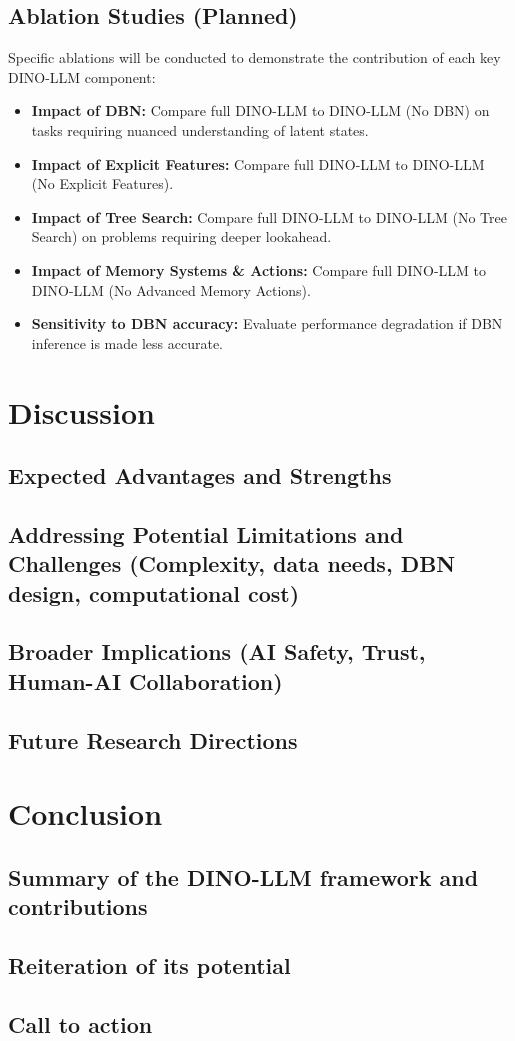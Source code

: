 \documentclass[11pt]{article}
\begin{document}
\subsection{Ablation Studies (Planned)}
\label{ssec:case_study_ablations}
Specific ablations will be conducted to demonstrate the contribution of each key DINO-LLM component:
\begin{itemize}
    \item \textbf{Impact of DBN:} Compare full DINO-LLM to DINO-LLM (No DBN) on tasks requiring nuanced understanding of latent states.
    \item \textbf{Impact of Explicit Features:} Compare full DINO-LLM to DINO-LLM (No Explicit Features).
    \item \textbf{Impact of Tree Search:} Compare full DINO-LLM to DINO-LLM (No Tree Search) on problems requiring deeper lookahead.
    \item \textbf{Impact of Memory Systems & Actions:} Compare full DINO-LLM to DINO-LLM (No Advanced Memory Actions).
    \item \textbf{Sensitivity to DBN accuracy:} Evaluate performance degradation if DBN inference is made less accurate.
\end{itemize}

\section{Discussion}
\label{sec:discussion}
\subsection{Expected Advantages and Strengths}
\subsection{Addressing Potential Limitations and Challenges (Complexity, data needs, DBN design, computational cost)}
\subsection{Broader Implications (AI Safety, Trust, Human-AI Collaboration)}
\subsection{Future Research Directions}

\section{Conclusion}
\label{sec:conclusion}
\subsection{Summary of the DINO-LLM framework and contributions}
\subsection{Reiteration of its potential}
\subsection{Call to action}

\end{document}
